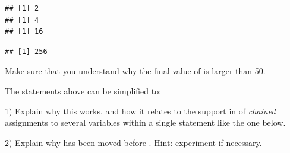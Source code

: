 \documentclass[krantz2]{krantz}\usepackage{knitr}%
\begin{document}
\begin{knitrout}\footnotesize
{}\color{fgcolor}\begin{kframe}
\begin{alltt}
 \hlkwb{<-} 
  \hlopt{<} \hlstd{) \{} \hlkwb{<-} \hlopt{^}\hlstd{\}}
\end{alltt}
\begin{verbatim}
## [1] 2
## [1] 4
## [1] 16
\end{verbatim}
\begin{alltt}
\end{alltt}
\begin{verbatim}
## [1] 256
\end{verbatim}
\end{kframe}
\end{knitrout}

\begin{playground}
Make sure that you understand why the final value of  is larger than 50.
\end{playground}


\begin{advplayground}
The statements above can be simplified to:
\begin{knitrout}\footnotesize
{}\color{fgcolor}\begin{kframe}
\begin{alltt}
 \hlkwb{<-} 
  \hlopt{<} \hlstd{) \{} \hlkwb{<-} \hlopt{^}\hlstd{)\}}
\end{alltt}
\end{kframe}
\end{knitrout}

1) Explain why this works, and how it relates to the support in \Rlang of \emph{chained} assignments to several variables within a single statement like the one below.
\begin{knitrout}\footnotesize
{}\color{fgcolor}\begin{kframe}
\begin{alltt}
 \hlkwb{<-}  \hlkwb{<-}  \hlkwb{<-} \hlopt{:}
\end{alltt}
\end{kframe}
\end{knitrout}

2) Explain why  has been moved before . Hint: experiment if necessary.
\end{advplayground}
\end{document}
